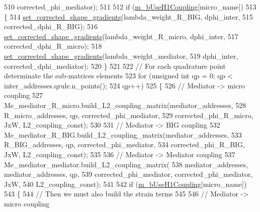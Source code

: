 \begin{DoxyCode}
510                     corrected\_phi\_mediator);
511 
512             \textcolor{keywordflow}{if} (\hyperlink{classcarl_1_1assemble__coupling__matrices_a9e3bf058bd10aacb63ebbab34fe37628}{m\_bUseH1Coupling}[micro\_name])
513             \{
514                 \hyperlink{classcarl_1_1assemble__coupling__matrices_a7f5ae4da1fe905fb90e9016f1dbb2fea}{set\_corrected\_shape\_gradients}(lambda\_weight\_R\_BIG, dphi\_inter,
515                         corrected\_dphi\_R\_BIG);
516                 \hyperlink{classcarl_1_1assemble__coupling__matrices_a7f5ae4da1fe905fb90e9016f1dbb2fea}{set\_corrected\_shape\_gradients}(lambda\_weight\_R\_micro, 
      dphi\_inter,
517                         corrected\_dphi\_R\_micro);
518                 \hyperlink{classcarl_1_1assemble__coupling__matrices_a7f5ae4da1fe905fb90e9016f1dbb2fea}{set\_corrected\_shape\_gradients}(lambda\_weight\_mediator,
519                         dphi\_inter, corrected\_dphi\_mediator);
520             \}
521 
522             \textcolor{comment}{// For each quadrature point determinate the sub-matrices elements}
523             \textcolor{keywordflow}{for} (\textcolor{keywordtype}{unsigned} \textcolor{keywordtype}{int} qp = 0; qp < inter\_addresses.qrule.n\_points();
524                     qp++)
525             \{
526                 \textcolor{comment}{// Mediator -> micro coupling}
527                 Me\_mediator\_R\_micro.build\_L2\_coupling\_matrix(mediator\_addresses,
528                         R\_micro\_addresses, qp, corrected\_phi\_mediator,
529                         corrected\_phi\_R\_micro, JxW, L2\_coupling\_const);
530 
531                 \textcolor{comment}{// Mediator -> BIG coupling}
532                 Me\_mediator\_R\_BIG.build\_L2\_coupling\_matrix(mediator\_addresses,
533                         R\_BIG\_addresses, qp, corrected\_phi\_mediator,
534                         corrected\_phi\_R\_BIG, JxW, L2\_coupling\_const);
535 
536                 \textcolor{comment}{// Mediator -> Mediator coupling}
537                 Me\_mediator\_mediator.build\_L2\_coupling\_matrix(
538                         mediator\_addresses, mediator\_addresses, qp,
539                         corrected\_phi\_mediator, corrected\_phi\_mediator, JxW,
540                         L2\_coupling\_const);
541 
542                 \textcolor{keywordflow}{if} (\hyperlink{classcarl_1_1assemble__coupling__matrices_a9e3bf058bd10aacb63ebbab34fe37628}{m\_bUseH1Coupling}[micro\_name])
543                 \{
544                     \textcolor{comment}{// Then we must also build the strain terms}
545 
546                     \textcolor{comment}{// Mediator -> micro coupling}

\end{DoxyCode}
